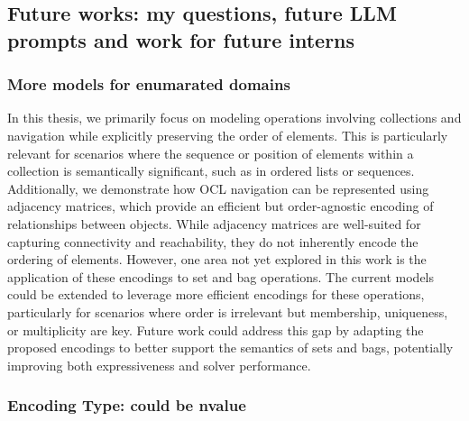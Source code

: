 \subsection*{Future works: my questions, future LLM prompts and work for future interns}

\subsubsection*{More models for enumarated domains}
In this thesis, we primarily focus on modeling operations involving collections and navigation while explicitly preserving the order of elements. This is particularly relevant for scenarios where the sequence or position of elements within a collection is semantically significant, such as in ordered lists or sequences. Additionally, we demonstrate how OCL navigation can be represented using adjacency matrices, which provide an efficient but order-agnostic encoding of relationships between objects. While adjacency matrices are well-suited for capturing connectivity and reachability, they do not inherently encode the ordering of elements.
However, one area not yet explored in this work is the application of these encodings to set and bag operations. The current models could be extended to leverage more efficient encodings for these operations, particularly for scenarios where order is irrelevant but membership, uniqueness, or multiplicity are key. Future work could address this gap by adapting the proposed encodings to better support the semantics of sets and bags, potentially improving both expressiveness and solver performance.


\subsubsection*{Encoding Type:  could be nvalue}

